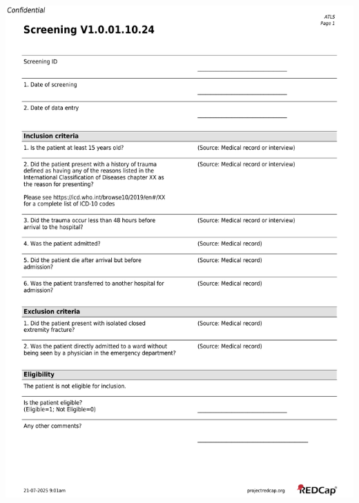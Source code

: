 \documentclass[
]{scrartcl}
\begin{document}
\includegraphics{../case-record-form/instrument-pdfs/pages/all-instruments-1.pdf}
\end{document}
